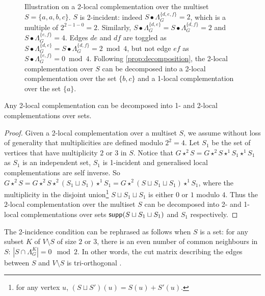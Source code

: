\documentclass[a4paper,UKenglish,cleveref,autoref,thm-restate]{arxiv}
\newcommand{\supp}{\textup{\textsf{supp}}}
\begin{document}
\begin{figure}[h]
    \caption{Illustration on a 2-local complementation over the multiset $S = \{a,a,b,c\}$. $S$ is 2-incident: indeed $S\bullet \Lambda_G^{\{d,e,f\}} = 2$, which is a multiple of $2^{2-1-0} = 2$. Similarly, $S\bullet \Lambda_G^{\{d,e\}} = S\bullet \Lambda_G^{\{d,f\}} = 2$ and $S\bullet \Lambda_G^{\{e,f\}} = 4$. Edges $de$ and $df$ are toggled as $S\bullet \Lambda_G^{\{d,e\}} = S\bullet \Lambda_G^{\{d,f\}} = 2\bmod 4$, but not edge $ef$ as $S\bullet \Lambda_G^{\{e,f\}} = 0\bmod 4$. Following \cref{prop:decomposition}, the 2-local complementation over $S$ can be decomposed into a 2-local complementation over the set $\{b,c\}$ and a 1-local complementation over the set $\{a\}$.}
    \label{fig:generalized_lc}    
    \end{figure}

\begin{proposition} \label{prop:decomposition}
Any 2-local complementation can be decomposed into 1- and 2-local complementations over sets.
\end{proposition}
\begin{proof}
Given a 2-local complementation over a multiset $S$, we assume without loss of generality that multiplicities are defined modulo $2^2 = 4$. Let  $S_1$ be the set of vertices that have multiplicity $2$ or $3$ in $S$. Notice that $G\star^2 S = G\star^2 S\star^1 S_1\star^1 S_1$ as $S_1$ is an independent set, $S_1$ is 1-incident and generalised local complementations are self inverse. So $G\star^2 S = G\star^2 S\star^2 (S_1 \sqcup S_1)\star^1 S_1 = G\star^2(S\sqcup S_1 \sqcup S_1)\star^1 S_1$, where the multiplicity in the disjoint union\footnote{for any vertex $u$, $(S\sqcup S')(u) = S(u)+S'(u)$.} $S\sqcup S_1 \sqcup S_1$ is either $0$ or $1$ modulo $4$. Thus the $2$-local complementation over the multiset $S$ can be decomposed into 2- and 1-local complementations over sets $\supp(S\sqcup S_1\sqcup S_1)$ and $S_1$ respectively. 
\end{proof}

  
The 2-incidence condition can be rephrased as follows when $S$ is a set: for any subset $K$ of $V\setminus S$ of size $2$ or $3$, there is an even number of common neighbours in $S$: $|S\cap \Lambda_G^K|=0\mod 2$. In other words, the cut matrix describing the edges between $S$ and $V\setminus S$ is tri-orthogonal \cite{bravyi2012magic, shi2024, nezami2022}.  
\end{document}
